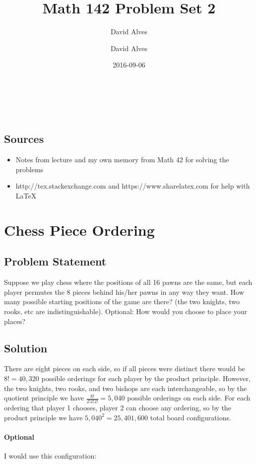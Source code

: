 \documentclass[12pt]{article}
\author{David Alves}
\title{Math 142 Problem Set 2}
\author{David Alves}
\date{2016-09-06}
\begin{document}

\begin{center}
\Large \thetitle \\
\large \theauthor \\
\thedate
\end{center}

\subsection*{Sources}

    \begin{itemize}
    \item Notes from lecture and my own memory from Math 42 for solving the problems
    \item http://tex.stackexchange.com and https://www.sharelatex.com for help with \LaTeX
    \end{itemize}

\section{Chess Piece Ordering}

\subsection*{Problem Statement}
Suppose we play chess where the positions of all 16 pawns are the same, but each player permutes the 8 pieces behind his/her pawns in any way they want. How many possible starting positions of the game are there? (the two knights, two rooks, etc are indistinguishable). Optional: How would you choose to place your places? 
\subsection*{Solution}

    There are eight pieces on each side, so if all pieces were distinct there would be $8!=40,320$ possible orderings for each player by the product principle. However, the two knights, two rooks, and two bishops are each interchangeable, so by the quotient principle we have $\frac{8!}{2!2!2!}=5,040$ possible orderings on each side. For each ordering that player 1 chooses, player 2 can choose any ordering, so by the product principle we have $5,040^2=25,401,600$ total board configurations.

    \paragraph{Optional}
    I would use this configuration: 
    \newline
    \newgame
    
\end{document}

